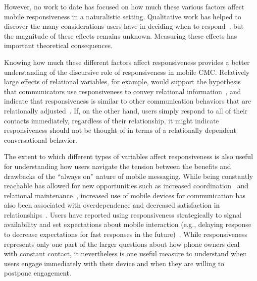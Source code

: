 \documentclass[12pt]{nuthesis}	%
\begin{document}
However, no work to date has focused on how much these various factors affect mobile responsiveness in a naturalistic setting. Qualitative work has helped to discover the many considerations users have in deciding when to respond~\citep[e.g.,][]{church2013s,cui2016beyond,rettie2009mobile,wohn2015ambient}, but the magnitude of these effects remains unknown. Measuring these effects has important theoretical consequences.

Knowing how much these different factors affect responsiveness provides a better understanding of the discursive role of responsiveness in mobile CMC. Relatively large effects of relational variables, for example, would support the hypothesis that communicators use responsiveness to convey relational information~\citep{kalman2006pauses,walther1995nonverbal}, and indicate that responsiveness is similar to other communication behaviors that are relationally adjusted~\citep{locher2005politeness}. If, on the other hand, users simply respond to all of their contacts immediately, regardless of their relationship, it might indicate responsiveness should not be thought of in terms of a relationally dependent conversational behavior.

The extent to which different types of variables affect responsiveness is also useful for understanding how users navigate the tension between the benefits and drawbacks of the ``always on'' nature of mobile messaging. While being constantly reachable has allowed for new opportunities such as increased coordination~\citep{ling200210} and relational maintenance~\citep{pettegrew2015smart}, increased use of mobile devices for communication has also been associated with overdependence and decreased satisfaction in relationships~\citep{hall2012calling}. Users have reported using responsiveness strategically to signal availability and set expectations about mobile interaction (e.g., delaying response to decrease expectations for fast responses in the future)~\citep{ames2013managing,wohn2015ambient}. While responsiveness represents only one part of the larger questions about how phone owners deal with constant contact, it nevertheless is one useful measure to understand when users engage immediately with their device and when they are willing to postpone engagement.
\end{document}
